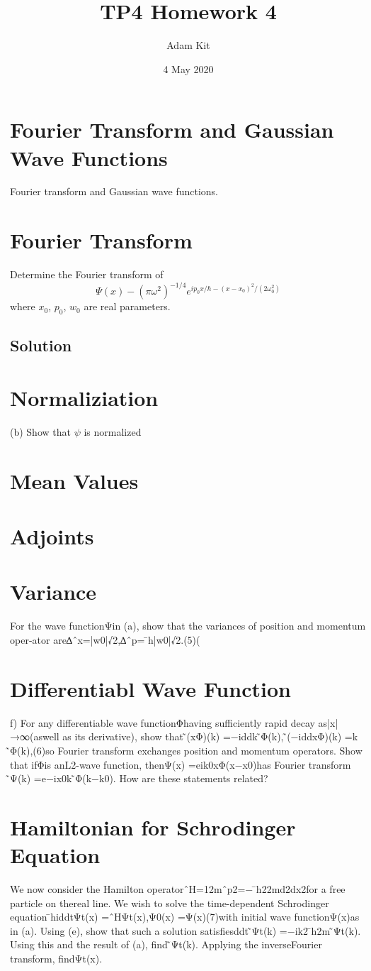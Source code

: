 \documentclass{article}
\title{TP4 Homework 4}
\author{Adam Kit}
\date{4 May 2020}
\begin{document}
\maketitle
\section*{Fourier Transform and Gaussian Wave Functions}
Fourier transform and Gaussian wave functions.
\section{Fourier Transform}

Determine the Fourier transform of $$ \Psi (x) - (\pi \omega^2)^{-1/4}e^{ip_0x/\hbar - (x-x_0)^2/(2\omega_0^2)}$$ where $x_0$, $p_0$, $w_0$ are real parameters.
\subsection*{Solution}

\section{Normaliziation}
(b)  Show that $\psi$ is normalized $ $
\section{Mean Values}

\section{Adjoints}

\section{Variance}
For the wave functionΨin (a), show that the variances of position and momentum oper-ator are∆ˆx=|w0|√2,∆ˆp= ̄h|w0|√2.(5)(
\section{Differentiabl Wave Function}
f)  For any differentiable wave functionΦhaving sufficiently rapid decay as|x|→∞(aswell as its derivative), show that ̃(xΦ)(k) =−iddk ̃Φ(k), ̃(−iddxΦ)(k) =k ̃Φ(k),(6)so Fourier transform exchanges position and momentum operators. Show that ifΦis anL2-wave function, thenΨ(x) =eik0xΦ(x−x0)has Fourier transform ̃Ψ(k) =e−ix0k ̃Φ(k−k0). How are these statements related?
\section{Hamiltonian for Schrodinger Equation}
We now consider the Hamilton operatorˆH=12mˆp2=− ̄h22md2dx2for a free particle on thereal line. We wish to solve the time-dependent Schrodinger equation ̄hiddtΨt(x) =ˆHΨt(x),Ψ0(x) =Ψ(x)(7)with initial wave functionΨ(x)as in (a).  Using (e), show that such a solution satisfiesddt ̃Ψt(k) =−ik2 ̄h2m ̃Ψt(k). Using this and the result of (a), find ̃Ψt(k). Applying the inverseFourier transform, findΨt(x).
\end{document}
